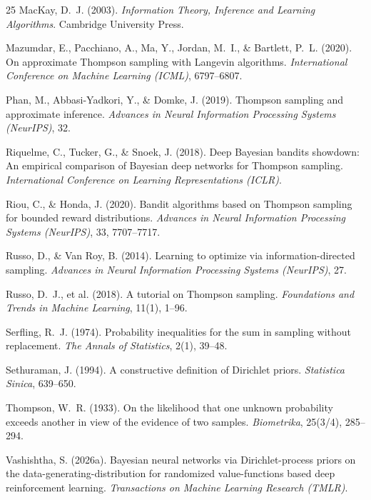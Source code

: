 \documentclass[twoside]{article}
\begin{document}
\begin{thebibliography}{25}
MacKay, D.~J. (2003).
\emph{Information Theory, Inference and Learning Algorithms}.
Cambridge University Press.

Mazumdar, E., Pacchiano, A., Ma, Y., Jordan, M.~I., \& Bartlett, P.~L. (2020).
On approximate Thompson sampling with Langevin algorithms.
\emph{International Conference on Machine Learning (ICML)}, 6797--6807.

Phan, M., Abbasi-Yadkori, Y., \& Domke, J. (2019).
Thompson sampling and approximate inference.
\emph{Advances in Neural Information Processing Systems (NeurIPS)}, 32.

Riquelme, C., Tucker, G., \& Snoek, J. (2018).
Deep Bayesian bandits showdown: An empirical comparison of Bayesian deep networks for Thompson sampling.
\emph{International Conference on Learning Representations (ICLR)}.

Riou, C., \& Honda, J. (2020).
Bandit algorithms based on Thompson sampling for bounded reward distributions.
\emph{Advances in Neural Information Processing Systems (NeurIPS)}, 33, 7707--7717.

Russo, D., \& Van Roy, B. (2014).
Learning to optimize via information-directed sampling.
\emph{Advances in Neural Information Processing Systems (NeurIPS)}, 27.

Russo, D.~J., et al. (2018).
A tutorial on Thompson sampling.
\emph{Foundations and Trends in Machine Learning}, 11(1), 1--96.

Serfling, R.~J. (1974).
Probability inequalities for the sum in sampling without replacement.
\emph{The Annals of Statistics}, 2(1), 39--48.

Sethuraman, J. (1994).
A constructive definition of Dirichlet priors.
\emph{Statistica Sinica}, 639--650.

Thompson, W.~R. (1933).
On the likelihood that one unknown probability exceeds another in view of the evidence of two samples.
\emph{Biometrika}, 25(3/4), 285--294.

Vashishtha, S. (2026a).
Bayesian neural networks via Dirichlet-process priors on the data-generating-distribution for randomized value-functions based deep reinforcement learning.
\emph{Transactions on Machine Learning Research (TMLR)}.


\end{thebibliography}
\end{document}
